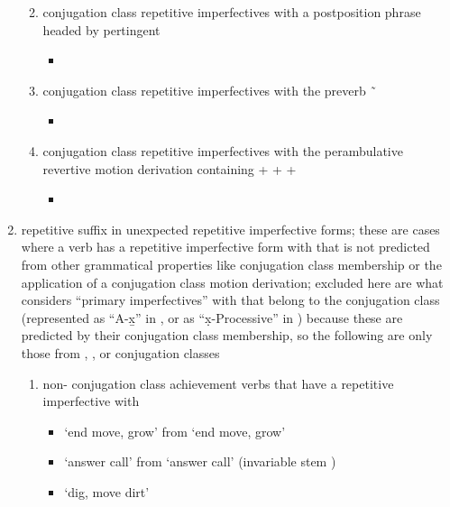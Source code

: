 \begin{morphdesc}[resume*=alphalist]
\begin{enumerate}
\begin{enumerate}
\begin{itemize}
			\end{itemize}
		\item	\label{item:-x̱-rep-motderiv-x̱}
			 conjugation class repetitive imperfectives with
			a postposition phrase headed by pertingent 
			\begin{itemize}
			\item	
			\end{itemize}
		\item	\label{item:-x̱-rep-motderiv-yetx̱}
			 conjugation class repetitive imperfectives with
			the preverb  \~\ 
			\begin{itemize}
			\item	
			\end{itemize}
		\item	\label{item:-x̱-rep-motderiv-ayaud}
			 conjugation class repetitive imperfectives with
			the perambulative revertive motion derivation
			containing  +  +  + 
			\begin{itemize}
			\item	
			\end{itemize}
		\end{enumerate}
	\item	\label{item:-x̱-rep-oddrep}
		repetitive suffix in unexpected repetitive imperfective forms;
		these are cases where a verb has a repetitive imperfective form with 
			that is not predicted from other grammatical properties like
			 conjugation class membership
			or the application of a  conjugation class motion derivation;
		excluded here are what \citeauthor{leer:1991} considers “primary imperfectives”
			with  that belong to the  conjugation class
			(represented as “A-x̱” in \cite[iii]{leer:1978b}, or as
			“x̣-Processive” in \cite[245]{leer:1991})
			because these are predicted by their conjugation class membership,
			so the following are only those from , \fm{g̱}, or 
			conjugation classes
		\begin{enumerate}
		\item	non- conjugation class achievement verbs
			that have a repetitive imperfective with 
			\begin{itemize}
			\item	{} ‘end move, grow’
				from  ‘end move, grow’
			\item	{} ‘answer call’
				from  ‘answer call’
					(invariable  stem )
			\item	{} ‘dig, move dirt’

\end{itemize}
\end{enumerate}
\end{enumerate}
\end{morphdesc}
